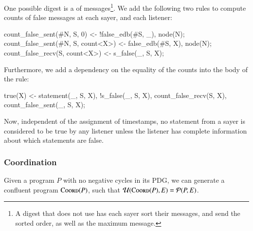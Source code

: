

One possible digest is a  of  messages\footnote{A digest that does not use  has each sayer sort their messages, and send the sorted order, as well as the maximum message.}.  We add the following two rules to compute counts of false messages at each sayer, and each listener:

\begin{Dedalus}
count_false_sent(#N, S, 0) <- !false_edb(#S, _), node(N);
count_false_sent(#N, S, count<X>) <- false_edb(#S, X),
                                     node(N);
count_false_recv(S, count<X>) <- s_false(_, S, X);
\end{Dedalus}

Furthermore, we add a dependency on the equality of the counts into the body of the  rule:

\begin{Dedalus}
true(X) <- statement(_, S, X), !s_false(_, S, X),
           count_false_recv(S, X),
           count_false_sent(_, S, X);
\end{Dedalus}

Now, independent of the assignment of timestamps, no statement from a sayer  is considered to be true by any listener unless the listener has complete information about which statements are false.

\subsubsection{Coordination}
\label{sec:coord}
Given a \lang program $P$ with no negative cycles in its PDG, we can generate a confluent program $\textsc{Coord}(P)$, such that \linebreak $\mathcal{U}(\textsc{Coord}(P), E) = \mathcal{P}(P, E)$.


